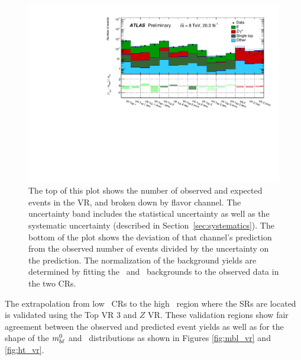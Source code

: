 \begin{figure}[ht]
\centering
\includegraphics[width=\textwidth]{figs/blstop/histpull_VR_detailed.pdf}
\caption{The top of this plot shows the number of observed and expected
  events in the VR, and broken down by flavor channel.
  The uncertainty band includes the statistical uncertainty as well as the
  systematic uncertainty (described in Section~\ref{sec:systematics}). The
  bottom of the plot shows the deviation of that channel's prediction
  from the observed number of events divided by the uncertainty on the
  prediction. The normalization of the background yields are determined
  by fitting the \TTBAR\ and \ZGAMMAJETS\ backgrounds to the observed
  data in the two CRs.
}
\label{fig:pull_dist_vr}
\end{figure}

The extrapolation from low \HT\ CRs to the high \HT\ region
where the SRs are located is validated using the Top VR 3
and $Z$ VR. These validation regions show fair
agreement between the observed and predicted event yields as well as
for the shape of the $m_{b\ell}^{0}$ and \HT\ distributions as shown in
Figures \ref{fig:mbl_vr} and \ref{fig:ht_vr}.

